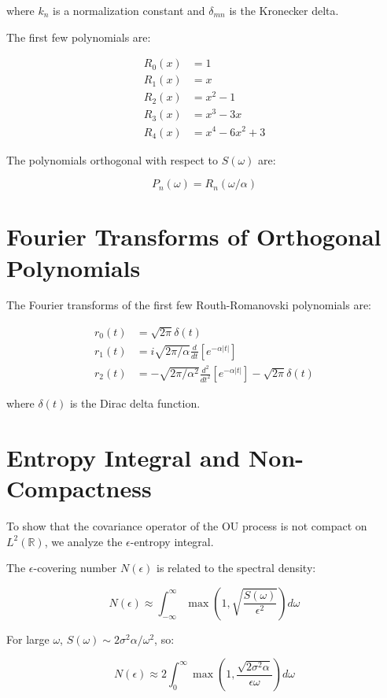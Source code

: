 \documentclass{article}
\begin{document}
where $k_n$ is a normalization constant and $\delta_{mn}$ is the Kronecker delta.

The first few polynomials are:

\begin{align*}
R_0(x) &= 1 \\
R_1(x) &= x \\
R_2(x) &= x^2 - 1 \\
R_3(x) &= x^3 - 3x \\
R_4(x) &= x^4 - 6x^2 + 3
\end{align*}

The polynomials orthogonal with respect to $S(\omega)$ are:

\[ P_n(\omega) = R_n(\omega/\alpha) \]

\section{Fourier Transforms of Orthogonal Polynomials}

The Fourier transforms of the first few Routh-Romanovski polynomials are:

\begin{align*}
r_0(t) &= \sqrt{2\pi} \delta(t) \\
r_1(t) &= i\sqrt{2\pi/\alpha} \frac{d}{dt} [e^{-\alpha|t|}] \\
r_2(t) &= -\sqrt{2\pi/\alpha^2} \frac{d^2}{dt^2} [e^{-\alpha|t|}] - \sqrt{2\pi} \delta(t)
\end{align*}

where $\delta(t)$ is the Dirac delta function.

\section{Entropy Integral and Non-Compactness}

To show that the covariance operator of the OU process is not compact on $L^2(\mathbb{R})$, we analyze the $\epsilon$-entropy integral.

The $\epsilon$-covering number $N(\epsilon)$ is related to the spectral density:

\[ N(\epsilon) \approx \int_{-\infty}^{\infty} \max\left(1, \sqrt{\frac{S(\omega)}{\epsilon^2}}\right) d\omega \]

For large $\omega$, $S(\omega) \sim 2\sigma^2\alpha/\omega^2$, so:

\[ N(\epsilon) \approx 2 \int_0^{\infty} \max\left(1, \frac{\sqrt{2\sigma^2\alpha}}{\epsilon\omega}\right) d\omega \]
\end{document}

